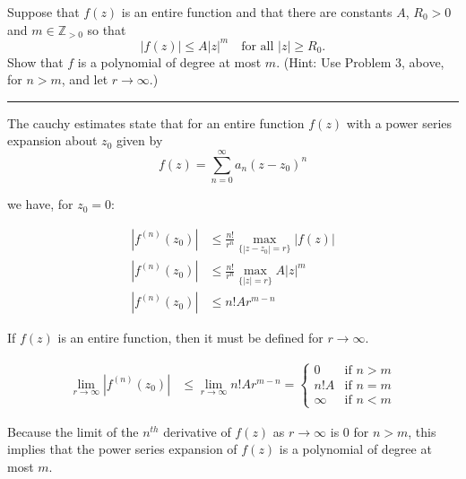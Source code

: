 \begin{example}
    Suppose that \( f(z) \) is an entire function and that there are constants \( A \), \( R_0 > 0 \) and \( m \in \mathbb{Z}_{>0} \) so that
    \[
        |f(z)| \leq A |z|^m \quad \text{for all } |z| \geq R_0.
    \]
    Show that \( f \) is a polynomial of degree at most \( m \). (Hint: Use Problem 3, above, for \( n > m \), and let \( r \to \infty \).)

    \hrule
    \vspace{0.5cm}

    The cauchy estimates state that for an entire function \( f(z) \) with a power series expansion about \( z_0 \) given by
    \[
        f(z) = \sum_{n=0}^{\infty} a_n (z - z_0)^n
    \]

    we have, for $z_0 = 0$:

    \begin{align*}
        |f^{(n)}(z_0)| & \leq \frac{n!}{r^n} \max_{\{|z - z_0| = r\}} |f(z)| \\
        |f^{(n)}(z_0)| & \leq \frac{n!}{r^n} \max_{\{|z| = r\}} A|z|^m       \\
        |f^{(n)}(z_0)| & \leq n! A r^{m-n}
    \end{align*}

    If \( f(z) \) is an entire function, then it must be defined for $r \to \infty$.

    \begin{align*}
        \lim_{r \to \infty} |f^{(n)}(z_0)| & \leq \lim_{r \to \infty} n! A r^{m-n} = \begin{cases}
                                                                                         0      & \text{if } n > m \\
                                                                                         n!A    & \text{if } n = m \\
                                                                                         \infty & \text{if } n < m
                                                                                     \end{cases}
    \end{align*}

    Because the limit of the $n^{th}$ derivative of \(f(z)\) as \(r \to \infty\) is 0 for \(n > m\), this implies that the power series expansion of \(f(z)\) is a polynomial of degree at most \(m\).
\end{example}

